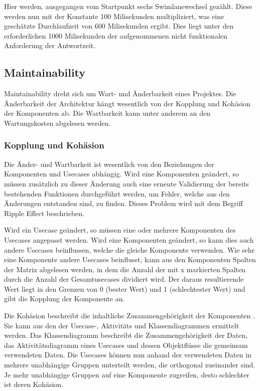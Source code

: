 Hier werden, ausgegangen vom Startpunkt sechs Swimlanewechsel gezählt. Diese werden nun mit der Konstante 100 Milisekunden multipliziert, was eine geschätzte Durchlaufzeit von 600 Milisekunden ergibt. Dies liegt unter den erforderlichen 1000 Milisekunden der aufgenommenen nicht funktionalen Anforderung der Antwortzeit.

\subsection{Maintainability}
Maintainability dreht sich um Wart- und Änderbarkeit eines Projektes. Die Änderbarkeit der Architektur hängt wesentlich von der Kopplung und Kohäsion der Komponenten ab. Die Wartbarkeit kann unter anderem an den Wartungskosten abgelesen werden.

\subsubsection{Kopplung und Kohäsion}
Die Änder- und Wartbarkeit ist wesentlich von den Beziehungen der Komponenten und Usecases abhängig. Wird eine Komponenten geändert, so müssen zusätzlich zu dieser Änderung auch eine erneute Validierung der bereits bestehenden Funktionen durchgeführt werden, um Fehler, welche aus den Änderungen entstanden sind, zu finden. Dieses Problem wird mit dem Begriff Ripple Effect beschrieben. \cite[S. 3]{ripple}

Wird ein Usecase geändert, so müssen eine oder mehrere Komponenten des Usecases angepasst werden. Wird eine Komponenten geändert, so kann dies auch andere Usecases beinflussen, welche die gleiche Komponente verwenden. Wie sehr eine Komponente andere Usecases beinflusst, kann aus den Komponenten Spalten der Matrix abgelesen werden, in dem die Anzahl der mit x markierten Spalten durch die Anzahl der Gesamtusecases dividiert wird. Der daraus resultierende Wert liegt in den Grenzen von 0 (bester Wert) und 1 (schlechtester Wert) und gibt die Kopplung der Komponente an. \cite[S. 164]{effektiv}

Die Kohäsion beschreibt die inhaltliche Zusammengehörigkeit der Komponenten \cite[S. 164]{effektiv}. Sie kann aus den der Usecase-, Aktivitäts und Klassendiagrammen ermittelt werden. Das Klassendiagramm beschreibt die Zusammengehörigkeit der Daten, das Aktivitätsdiagramm eines Usecases und dessen Objektflüsse die gemeinsam verwendeten Daten. Die Usecases können nun anhand der verwendeten Daten in mehrere unabhängige Gruppen unterteilt werden, die orthogonal zueinander sind. Je mehr unabhängige Gruppen auf eine Komponente zugreifen, desto schlechter ist deren Kohäsion.

